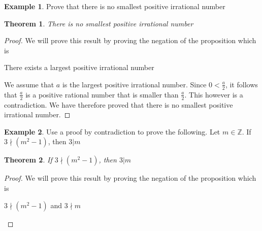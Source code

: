 \documentclass{book}
\newtheorem{theorem}{Theorem}[section]
\theoremstyle{definition}
\newtheorem{example}{Example}[definition]
\theoremstyle{remark}
\newcommand{\bb}[1]{\mathbb{#1}}
\begin{document}
\newpage
\begin{example}
Prove that there is no smallest positive irrational number
\begin{tcolorbox}
    \begin{theorem}
        There is no smallest positive irrational number
    \end{theorem} 
\end{tcolorbox}


\begin{proof}

We will prove this result by proving the negation of the proposition which is
	\begin{center}
		There exists a largest positive irrational number
	\end{center}

We assume that $a$ is the largest positive irrational number. Since $0 < \frac{a}{2}$, it follows that $\frac{a}{2}$ is a positive rational number that is smaller than $\frac{a}{2}$. This however is a contradiction. We have therefore proved that there is no smallest positive irrational number.
\end{proof}
\end{example}

\newpage
\begin{example}
Use a proof by contradiction to prove the following. Let $m \in \bb{Z}$. If $3 \nmid (m^2 - 1)$, then $3 | m$
\begin{tcolorbox}
    \begin{theorem}
        If $3 \nmid (m^2 - 1)$, then $3 | m$
    \end{theorem} 
\end{tcolorbox}

\begin{proof}
We will prove this result by proving the negation of the proposition which is
	\begin{center}
		$3 \nmid (m^2 - 1)$ and $3 \nmid m$
	\end{center}


\end{proof}
\end{example}
\end{document}
